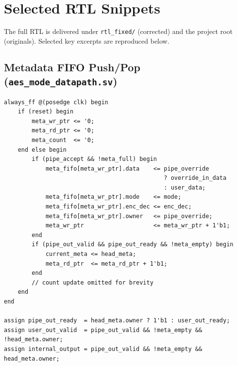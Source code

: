 \documentclass[conference,10pt,a4paper]{IEEEtran}
\begin{document}
\appendices

\section{Selected RTL Snippets}
\label{app:rtl}

The full RTL is delivered under \texttt{rtl\_fixed/} (corrected) and the
project root (originals).  Selected key excerpts are reproduced below.

\subsection{Metadata FIFO Push/Pop (\texttt{aes\_mode\_datapath.sv})}
\begin{lstlisting}
always_ff @(posedge clk) begin
    if (reset) begin
        meta_wr_ptr <= '0;
        meta_rd_ptr <= '0;
        meta_count  <= '0;
    end else begin
        if (pipe_accept && !meta_full) begin
            meta_fifo[meta_wr_ptr].data    <= pipe_override
                                              ? override_in_data
                                              : user_data;
            meta_fifo[meta_wr_ptr].mode    <= mode;
            meta_fifo[meta_wr_ptr].enc_dec <= enc_dec;
            meta_fifo[meta_wr_ptr].owner   <= pipe_override;
            meta_wr_ptr                    <= meta_wr_ptr + 1'b1;
        end
        if (pipe_out_valid && pipe_out_ready && !meta_empty) begin
            current_meta <= head_meta;
            meta_rd_ptr  <= meta_rd_ptr + 1'b1;
        end
        // count update omitted for brevity
    end
end

assign pipe_out_ready  = head_meta.owner ? 1'b1 : user_out_ready;
assign user_out_valid  = pipe_out_valid && !meta_empty && !head_meta.owner;
assign internal_output = pipe_out_valid && !meta_empty &&  head_meta.owner;
\end{lstlisting}
\end{document}

